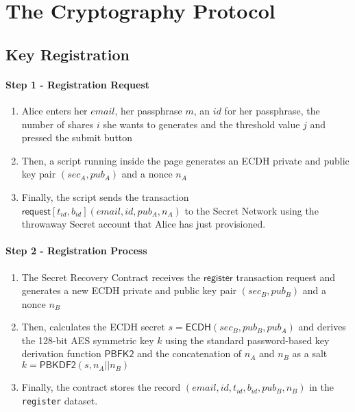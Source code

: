 \documentclass[12pt]{article}
\newcommand{\ms}[1]{\ensuremath{\mathsf{#1}}}
\newcommand{\tx}[3]{\ms{#1}[#2](#3)}
\begin{document}
\newpage

\section{The Cryptography Protocol}

\subsection{Key Registration}

\paragraph{Step 1 - Registration Request}

\begin{enumerate}[label=1.\arabic*]
  \item Alice enters her $email$, her passphrase $m$, an $id$ for her passphrase, the number of shares $i$ she wants to generates and the threshold value $j$ and pressed the submit button
  \item Then, a script running inside the page generates an ECDH private and public key pair $(sec_A, pub_A)$ and a nonce $n_A$
  \item Finally, the script sends the transaction $\tx{request}{t_{id}, b_{id}}{email, id, pub_A, n_A}$ to the Secret Network using the throwaway Secret account that Alice has just provisioned.
\end{enumerate}

\paragraph{Step 2 - Registration Process}

\begin{enumerate}[label=2.\arabic*]
  \item The Secret Recovery Contract receives the $\ms{register}$ transaction request and generates a new ECDH private and public key pair $(sec_B, pub_B)$ and a nonce $n_B$
  \item Then, calculates the ECDH secret $s=\ms{ECDH}(sec_B, pub_B, pub_A)$ and derives the 128-bit AES symmetric key $k$ using the standard password-based key derivation function $\ms{PBFK2}$ and the concatenation of $n_A$ and $n_B$ as a salt $k=\ms{PBKDF2}(s, n_A || n_B)$
  \item Finally, the contract stores the record $(email, id, t_{id}, b_{id}, pub_B, n_B)$ in the {\tt register} dataset. 
\end{enumerate}
\end{document}
